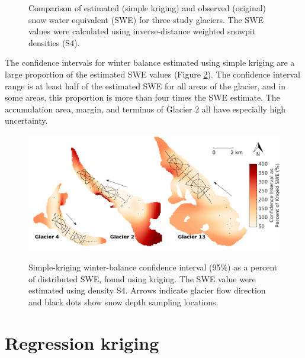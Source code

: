 \documentclass{sfuthesis}
\newcommand{\topomap}{Arrows indicate glacier flow direction and black dots show snow depth sampling locations. }
\begin{document}
\begin{figure}
	\caption{Comparison of estimated (simple kriging) and observed (original) snow water equivalent (SWE) for three study glaciers. The SWE values were calculated using inverse-distance weighted snowpit densities (S4).}
	\label{fig:R2simplekrig}
\end{figure}

The confidence intervals for winter balance estimated using simple kriging are a large proportion of the estimated SWE values (Figure \ref{fig:krigingCI_percent}). The confidence interval range is at least half of the estimated SWE for all areas of the glacier, and in some areas, this proportion is more than four times the SWE estimate. The accumulation area, margin, and terminus of Glacier 2 all have especially high uncertainty. 

\begin{figure}[H]
	\centering
	\includegraphics[width = \textwidth]{KrigingCI_percent.png}\\
	\caption{Simple-kriging winter-balance confidence interval (95\%) as a percent of distributed SWE, found using kriging. The SWE value were estimated using density S4. \topomap}
	\label{fig:krigingCI_percent}
\end{figure}

\section{Regression kriging}
\end{document}
